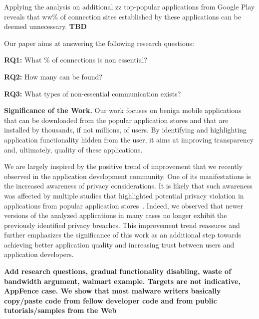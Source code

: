 Applying the analysis on additional zz top-popular applications from Google Play reveals that ww\% of connection sites established by these applications can be deemed unnecessary.
{\bf TBD}

Our paper aims at answering the following research questions:

\vspace{0.1in}
{\bf RQ1:} What \% of connections is non essential?

{\bf RQ2:} How many can be found?

{\bf RQ3:} What types of non-essential communication exists?


\vspace{0.1in}
\noindent 
{\bf Significance of the Work.}
Our work focuses on benign  mobile applications that can be downloaded from the popular application stores and that are installed by thousands, if not millions, of users.
By identifying and highlighting application functionality hidden from the user, it aims at improving transparency and, ultimately, quality of these applications. 
 
We are largely inspired by the positive trend of improvement that we recently observed in the application development community.
One of its manifestations is the increased awareness of privacy considerations. It is likely that such awareness was affected by multiple studies that highlighted
potential privacy violation in applications from popular application stores~\cite{Enck:Gilbert:Chun:Cox:Jung:McDaniel:Sheth:OSDI10, Egele:Kruegel:Kirda:Vign:NDSS11,Tripp:Rubin:SEC14}.
Indeed, we observed that newer versions of the analyzed applications in many cases no longer exhibit the previously identified privacy breaches.  
This improvement trend reassures and further emphasizes the significance of this work as an additional step towards achieving better application quality and increasing trust between users and application developers. 

{\bf Add research questions, gradual functionality disabling, waste of bandwidth argument, walmart example. 
Targets are not indicative, AppFence case. We show that most malware writers basically
copy/paste code from fellow developer code and from
public tutorials/samples from the Web~\cite{Allix:Jerome:Bissyande:Klein:State:Traon:COMPSAC14}


}





